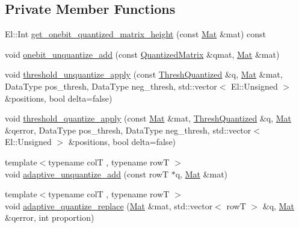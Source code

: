 \subsection*{Private Member Functions}
\begin{DoxyCompactItemize}
\item 
El\+::\+Int \hyperlink{classlbann_1_1lbann__quantizer_aa1541b9afa60250dbd570acbbe98242f}{get\+\_\+onebit\+\_\+quantized\+\_\+matrix\+\_\+height} (const \hyperlink{base_8hpp_a68f11fdc31b62516cb310831bbe54d73}{Mat} \&mat) const
\item 
void \hyperlink{classlbann_1_1lbann__quantizer_a879cea8464408b8265be9e55edd83b2c}{onebit\+\_\+unquantize\+\_\+add} (const \hyperlink{classlbann_1_1lbann__quantizer_a399f3f8c393b6021b43e95d1ce6ea28c}{Quantized\+Matrix} \&qmat, \hyperlink{base_8hpp_a68f11fdc31b62516cb310831bbe54d73}{Mat} \&mat)
\item 
void \hyperlink{classlbann_1_1lbann__quantizer_ab12b432ba2901347b025e8b6ec40a3c6}{threshold\+\_\+unquantize\+\_\+apply} (const \hyperlink{classlbann_1_1lbann__quantizer_a85ea8e298c2975b4f802855278406aa7}{Thresh\+Quantized} \&q, \hyperlink{base_8hpp_a68f11fdc31b62516cb310831bbe54d73}{Mat} \&mat, Data\+Type pos\+\_\+thresh, Data\+Type neg\+\_\+thresh, std\+::vector$<$ El\+::\+Unsigned $>$ \&positions, bool delta=false)
\item 
void \hyperlink{classlbann_1_1lbann__quantizer_a2bcdf31781bf72bbe63940ea0d92990f}{threshold\+\_\+quantize\+\_\+apply} (const \hyperlink{base_8hpp_a68f11fdc31b62516cb310831bbe54d73}{Mat} \&mat, \hyperlink{classlbann_1_1lbann__quantizer_a85ea8e298c2975b4f802855278406aa7}{Thresh\+Quantized} \&q, \hyperlink{base_8hpp_a68f11fdc31b62516cb310831bbe54d73}{Mat} \&qerror, Data\+Type pos\+\_\+thresh, Data\+Type neg\+\_\+thresh, std\+::vector$<$ El\+::\+Unsigned $>$ \&positions, bool delta=false)
\item 
{\footnotesize template$<$typename colT , typename rowT $>$ }\\void \hyperlink{classlbann_1_1lbann__quantizer_a1f63f7be2e227a48ebaa25056e6f85bc}{adaptive\+\_\+unquantize\+\_\+add} (const rowT $\ast$q, \hyperlink{base_8hpp_a68f11fdc31b62516cb310831bbe54d73}{Mat} \&mat)
\item 
{\footnotesize template$<$typename colT , typename rowT $>$ }\\void \hyperlink{classlbann_1_1lbann__quantizer_a25ed3869c6bc615ae51198803ea4e33d}{adaptive\+\_\+quantize\+\_\+replace} (\hyperlink{base_8hpp_a68f11fdc31b62516cb310831bbe54d73}{Mat} \&mat, std\+::vector$<$ rowT $>$ \&q, \hyperlink{base_8hpp_a68f11fdc31b62516cb310831bbe54d73}{Mat} \&qerror, int proportion)

\end{DoxyCompactItemize}
